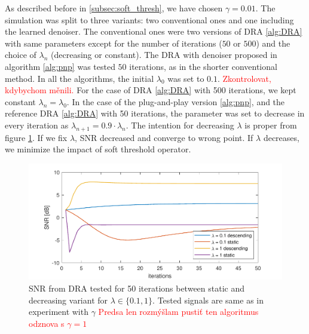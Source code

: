 \documentclass[conference]{IEEEtran}
\newcommand{\todo}[1]{\textcolor{red}{#1}}
\begin{document}
As described before in \ref{subsec:soft_thresh}, we have chosen $\gamma = 0.01$.
The simulation was split to three variants: two conventional ones and one including the learned denoiser.
The conventional ones were two versions of DRA \ref{alg:DRA} with same parameters except for the number of iterations ($50$ or $500$) and the choice of $\lambda_n$ (decreasing or constant).
The DRA with denoiser proposed in algorithm \ref{alg:pnp} was tested $50$ iterations,
as in the shorter conventional method.
In all the algorithms, the initial $\lambda_0$ was set to $0.1$. \todo{Zkontrolovat, kdybychom měnili.}
For the case of DRA \ref{alg:DRA} with 500 iterations, we kept constant $\lambda_n = \lambda_0$.
In the case of the plug-and-play version \ref{alg:pnp}, and the reference DRA \ref{alg:DRA} with 50 iterations, the parameter was set to decrease in every iteration as $\lambda_{n+1} = 0.9\cdot\lambda_n$.
The intention for decreasing $\lambda$ is proper from figure \ref{fig:lamdadesc}.
If we fix $\lambda$, SNR decreased and converge to wrong point.
If $\lambda$ decreases, we minimize the impact of soft threshold operator.

\begin{figure}[h]
	\centering
	\includegraphics[width=1\linewidth]{figures/lamda_desc}
	\caption{SNR from DRA tested for 50 iterations between static and decreasing variant for $\lambda \in \{0.1,1 \}$.
	Tested signals are same as in experiment with $\gamma$
	\todo{Predsa len rozmýšlam pustiť ten algoritmus odznova s $\gamma=1$}}
	\label{fig:lamdadesc}
\end{figure}

\end{document}
